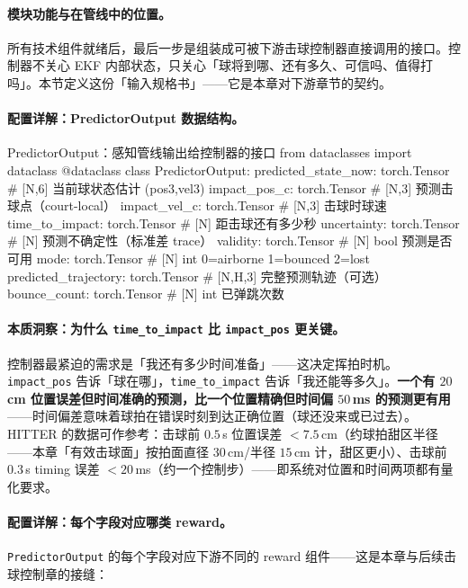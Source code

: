 \paragraph{模块功能与在管线中的位置。}所有技术组件就绪后，最后一步是组装成可被下游击球控制器直接调用的接口。控制器不关心 EKF 内部状态，只关心「球将到哪、还有多久、可信吗、值得打吗」。本节定义这份「输入规格书」——它是本章对下游章节的契约。

\paragraph{配置详解：PredictorOutput 数据结构。}

\begin{codebox}[Python]{PredictorOutput：感知管线输出给控制器的接口}
from dataclasses import dataclass
@dataclass
class PredictorOutput:
    predicted_state_now: torch.Tensor   # [N,6] 当前球状态估计 (pos3,vel3)
    impact_pos_c:        torch.Tensor   # [N,3] 预测击球点（court-local）
    impact_vel_c:        torch.Tensor   # [N,3] 击球时球速
    time_to_impact:      torch.Tensor   # [N]   距击球还有多少秒
    uncertainty:         torch.Tensor   # [N]   预测不确定性（标准差 trace）
    validity:            torch.Tensor   # [N] bool 预测是否可用
    mode:                torch.Tensor   # [N] int 0=airborne 1=bounced 2=lost
    predicted_trajectory: torch.Tensor  # [N,H,3] 完整预测轨迹（可选）
    bounce_count:        torch.Tensor   # [N] int 已弹跳次数
\end{codebox}

\paragraph{本质洞察：为什么 \texttt{time\_to\_impact} 比 \texttt{impact\_pos} 更关键。}控制器最紧迫的需求是「我还有多少时间准备」——这决定挥拍时机。\verb|impact_pos| 告诉「球在哪」，\verb|time_to_impact| 告诉「我还能等多久」。\textbf{一个有 $20$\,cm 位置误差但时间准确的预测，比一个位置精确但时间偏 $50$\,ms 的预测更有用}——时间偏差意味着球拍在错误时刻到达正确位置（球还没来或已过去）。HITTER 的数据可作参考：击球前 $0.5$\,s 位置误差 $<7.5$\,cm（约球拍甜区半径——本章「有效击球面」按拍面直径 $30$\,cm/半径 $15$\,cm 计，甜区更小）、击球前 $0.3$\,s timing 误差 $<20$\,ms（约一个控制步）\cite{tennis_hitter2025}——即系统对位置和时间两项都有量化要求。

\paragraph{配置详解：每个字段对应哪类 reward。}\verb|PredictorOutput| 的每个字段对应下游不同的 reward 组件——这是本章与后续击球控制章的接缝：

